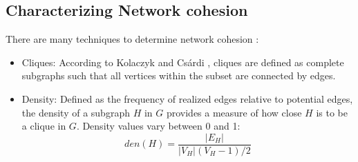 \subsection{Characterizing Network cohesion}
\label{sec:back_netChar}
There are many techniques to determine network cohesion \citep{kolaczyk_statistical_2014}:
\begin{itemize}
\item Cliques: According to Kolaczyk and Cs\'ardi \cite{kolaczyk_statistical_2014}, cliques are defined as complete subgraphs such that all vertices within the subset are connected by edges. %
\item Density: Defined as the frequency of realized edges relative to potential edges, the density of a subgraph $H$ in $G$ provides a measure of how close $H$ is to be a clique in $G$. Density values vary between 0 and 1:
\begin{equation} 
den(H)=\frac{|E_H|}{|V_H|(V_H-1)/2} 
\end{equation}


\end{itemize}
